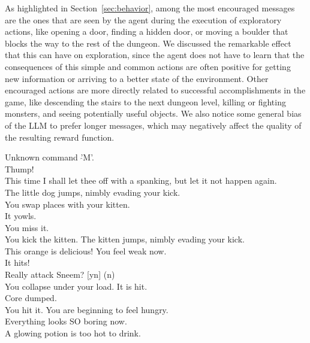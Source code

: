 \documentclass{article} %
\begin{document}
As highlighted in Section~\ref{sec:behavior}, among the most encouraged messages are the ones that are seen by the agent during the execution of exploratory actions, like opening a door, finding a hidden door, or moving a boulder that blocks the way to the rest of the dungeon.
We discussed the remarkable effect that this can have on exploration, since the agent does not have to learn that the consequences of this simple and common actions are often positive for getting new information or arriving to a better state of the environment.
Other encouraged actions are more directly related to successful accomplishments in the game, like descending the stairs to the next dungeon level, killing or fighting monsters, and seeing potentially useful objects.
We also notice some general bias of the LLM to prefer longer messages, which may negatively affect the quality of the resulting reward function.

\begin{messages}[h]
\begin{mymessagebox}[frametitle=Least preferred messages]
\small{}\selectfont
Unknown command '$\hat{}$M'.\\
Thump!\\
This time I shall let thee off with a spanking, but let it not happen again.\\
The little dog jumps, nimbly evading your kick.\\
You swap places with your kitten.\\
It yowls.\\
You miss it.\\
You kick the kitten.  The kitten jumps, nimbly evading your kick.\\
This orange is delicious!  You feel weak now.\\
It hits!\\
Really attack Sneem? [yn] (n)\\
You collapse under your load.  It is hit.\\
Core dumped.\\
You hit it.  You are beginning to feel hungry.\\
Everything looks SO boring now.\\
A glowing potion is too hot to drink.\\
\end{mymessagebox}
\caption{Least preferred messages according to the reward function induced by feeding the default prompt to the LLM for annotating the dataset.}
\label{msg:notpref}
\end{messages}
\end{document}
